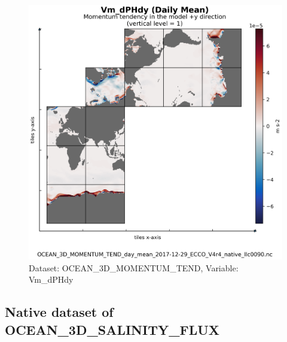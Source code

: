 \begin{figure}[H]
\centering
\includegraphics[scale=0.55]{../images/plots/native_plots/Ocean_Three-Dimensional_Momentum_Tendency/Vm_dPHdy.png}
\caption{Dataset: OCEAN\_3D\_MOMENTUM\_TEND, Variable: Vm\_dPHdy}
\label{tab:table-OCEAN_3D_MOMENTUM_TEND_Vm_dPHdy-Plot}
\end{figure}
\newpage
\subsection{Native dataset of OCEAN\_3D\_SALINITY\_FLUX}
\newp
